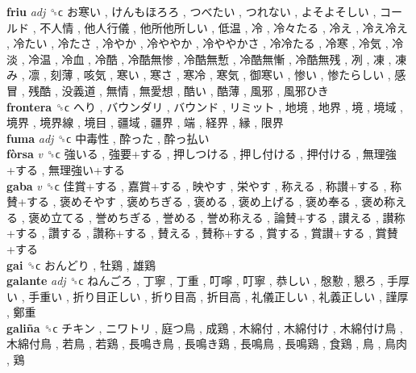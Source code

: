 \textbf{friu} \emph{adj}  ␝ϲ   お寒い ,  けんもほろろ ,  つべたい ,  つれない ,  よそよそしい ,  コールド ,  不人情 ,  他人行儀 ,  他所他所しい ,  低温 ,  冷 ,  冷々たる ,  冷え ,  冷え冷え ,  冷たい ,  冷たさ ,  冷やか ,  冷ややか ,  冷ややかさ ,  冷冷たる ,  冷寒 ,  冷気 ,  冷淡 ,  冷温 ,  冷血 ,  冷酷 ,  冷酷無惨 ,  冷酷無慙 ,  冷酷無慚 ,  冷酷無残 ,  冽 ,  凍 ,  凍み ,  凛 ,  刻薄 ,  咳気 ,  寒い ,  寒さ ,  寒冷 ,  寒気 ,  御寒い ,  惨い ,  惨たらしい ,  感冒 ,  残酷 ,  没義道 ,  無情 ,  無愛想 ,  酷い ,  酷薄 ,  風邪 ,  風邪ひき   \\
\textbf{frontera} ␝ϲ   へり ,  バウンダリ ,  バウンド ,  リミット ,  地境 ,  地界 ,  境 ,  境域 ,  境界 ,  境界線 ,  境目 ,  疆域 ,  疆界 ,  端 ,  経界 ,  縁 ,  限界   \\
\textbf{fuma} \emph{adj}  ␝ϲ   中毒性 ,  酔った ,  酔っ払い   \\
\textbf{fòrsa} \emph{v}  ␝ϲ   強いる ,  強要+する ,  押しつける ,  押し付ける ,  押付ける ,  無理強+する ,  無理強い+する   \\
\textbf{gaba} \emph{v}  ␝ϲ   佳賞+する ,  嘉賞+する ,  映やす ,  栄やす ,  称える ,  称讃+する ,  称賛+する ,  褒めそやす ,  褒めちぎる ,  褒める ,  褒め上げる ,  褒め奉る ,  褒め称える ,  褒め立てる ,  誉めちぎる ,  誉める ,  誉め称える ,  論賛+する ,  讃える ,  讃称+する ,  讚する ,  讚称+する ,  賛える ,  賛称+する ,  賞する ,  賞讃+する ,  賞賛+する   \\
\textbf{gai} ␝ϲ   おんどり ,  牡鶏 ,  雄鶏   \\
\textbf{galante} \emph{adj}  ␝ϲ   ねんごろ ,  丁寧 ,  丁重 ,  叮嚀 ,  叮寧 ,  恭しい ,  慇懃 ,  懇ろ ,  手厚い ,  手重い ,  折り目正しい ,  折り目高 ,  折目高 ,  礼儀正しい ,  礼義正しい ,  謹厚 ,  鄭重   \\
\textbf{galiña} ␝ϲ   チキン ,  ニワトリ ,  庭つ鳥 ,  成鶏 ,  木綿付 ,  木綿付け ,  木綿付け鳥 ,  木綿付鳥 ,  若鳥 ,  若鶏 ,  長鳴き鳥 ,  長鳴き鶏 ,  長鳴鳥 ,  長鳴鶏 ,  食鶏 ,  鳥 ,  鳥肉 ,  鶏   \\

